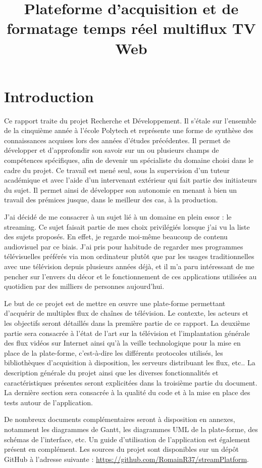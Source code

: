 \documentclass{polytech/polytech}
\title{Plateforme d'acquisition et de formatage temps réel multiflux TV Web}
\begin{document}
\chapter*{Introduction}


Ce rapport traite du projet Recherche et Développement. Il s’étale sur l’ensemble de la cinquième année à l'école Polytech et représente une forme de synthèse des connaissances acquises lors des années d’études précédentes. Il permet de développer et d’approfondir son savoir sur un ou plusieurs champs de compétences spécifiques, afin de devenir un spécialiste du domaine choisi dans le cadre du projet. Ce travail est mené seul, sous la supervision d'un tuteur académique et avec l’aide d’un intervenant extérieur qui fait partie des initiateurs du sujet. Il permet ainsi de développer son autonomie en menant à bien un travail des prémices jusque, dans le meilleur des cas, à la production.

J’ai décidé de me consacrer à un sujet lié à un domaine en plein essor : le streaming. Ce sujet faisait partie de mes choix privilégiés lorsque j’ai vu la liste des sujets proposés. En effet, je regarde moi-même beaucoup de contenu audiovisuel par ce biais. J’ai pris pour habitude de regarder mes programmes télévisuelles préférés via mon ordinateur plutôt que par les usages traditionnelles avec une télévision depuis plusieurs années déjà, et il m’a paru intéressant de me pencher sur l’envers du décor et le fonctionnement de ces applications utilisées au quotidien par des milliers de personnes aujourd’hui.

Le but de ce projet est de mettre en \oe{}uvre une plate-forme permettant d'acquérir de multiples flux de chaînes de télévision. Le contexte, les acteurs et les objectifs seront détaillés dans la première partie de ce rapport. La deuxième partie sera consacrée à l'état de l'art sur la télévision et l'implantation générale des flux vidéos sur Internet ainsi qu'à la veille technologique pour la mise en place de la plate-forme, c'est-à-dire les différents protocoles utilisés, les bibliothèques d'acquisition à disposition, les serveurs distribuant les flux, etc.. La description générale du projet ainsi que les diverses fonctionnalités et caractéristiques présentes seront explicitées dans la troisième partie du document. La dernière section sera consacrée à la qualité du code et à la mise en place des tests autour de l'application. 

De nombreux documents complémentaires seront à disposition en annexes, notamment les diagrammes de Gantt, les diagrammes UML de la plate-forme, des schémas de l'interface, etc. Un guide d'utilisation de l'application est également présent en complément. Les sources du projet sont disponibles sur un dépôt GitHub à l'adresse suivante : \url{https://github.com/RomainR37/streamPlatform}.
\end{document}
